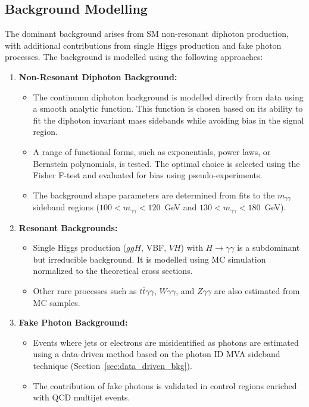 \subsection{Background Modelling}
The dominant background arises from SM non-resonant diphoton production, with additional contributions from single Higgs production and fake photon processes. The background is modelled using the following approaches:

\begin{enumerate}
    \item \textbf{Non-Resonant Diphoton Background:}
    \begin{itemize}
        \item The continuum diphoton background is modelled directly from data using a smooth analytic function. This function is chosen based on its ability to fit the diphoton invariant mass sidebands while avoiding bias in the signal region.
        \item A range of functional forms, such as exponentials, power laws, or Bernstein polynomials, is tested. The optimal choice is selected using the Fisher F-test and evaluated for bias using pseudo-experiments.
        \item The background shape parameters are determined from fits to the \(m_{\gamma\gamma}\) sideband regions (\(100 < m_{\gamma\gamma} < 120\)~GeV and \(130 < m_{\gamma\gamma} < 180\)~GeV).
    \end{itemize}

    \item \textbf{Resonant Backgrounds:}
    \begin{itemize}
        \item Single Higgs production (\(ggH\), VBF, \(VH\)) with \(H \to \gamma\gamma\) is a subdominant but irreducible background. It is modelled using MC simulation normalized to the theoretical cross sections.
        \item Other rare processes such as \(t\bar{t}\gamma\gamma\), \(W\gamma\gamma\), and \(Z\gamma\gamma\) are also estimated from MC samples.
    \end{itemize}

    \item \textbf{Fake Photon Background:}
    \begin{itemize}
        \item Events where jets or electrons are misidentified as photons are estimated using a data-driven method based on the photon ID MVA sideband technique (Section~\ref{sec:data_driven_bkg}).
        \item The contribution of fake photons is validated in control regions enriched with QCD multijet events.
    \end{itemize}
\end{enumerate}

